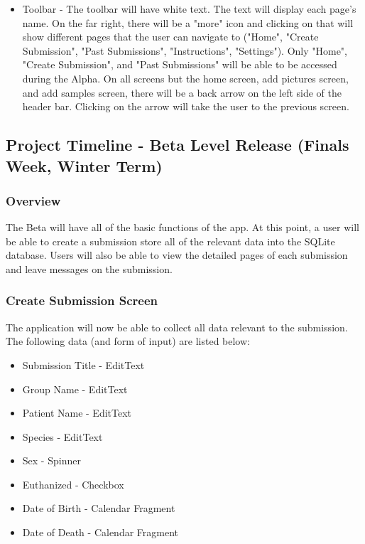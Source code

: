 \documentclass[onecolumn, draftclsnofoot,10pt, compsoc]{IEEEtran}
\begin{document}
\begin{itemize}
\item Toolbar - The toolbar will have white text. The text will display each page's name. On the far right, there will be a "more" icon and clicking on that will show different pages that the user can navigate to ("Home", "Create Submission", "Past Submissions", "Instructions", "Settings"). Only "Home", "Create Submission", and "Past Submissions" will be able to be accessed during the Alpha. On all screens but the home screen, add pictures screen, and add samples screen, there will be a back arrow on the left side of the header bar. Clicking on the arrow will take the user to the previous screen.

\end{itemize}

\subsection{Project Timeline - Beta Level Release (Finals Week, Winter Term)}
\subsubsection{Overview}
The Beta will have all of the basic functions of the app. At this point, a user will be able to create a submission store all of the relevant data into the SQLite database. Users will also be able to view the detailed pages of each submission and leave messages on the submission. 

\subsubsection{Create Submission Screen}
The application will now be able to collect all data relevant to the submission. The following data (and form of input) are listed below:
\begin{itemize}
    \item Submission Title - EditText
    \item Group Name - EditText
    \item Patient Name - EditText
    \item Species - EditText
    \item Sex - Spinner
    \item Euthanized - Checkbox
    \item Date of Birth - Calendar Fragment
    \item Date of Death - Calendar Fragment
    
\end{itemize}
\end{document}

